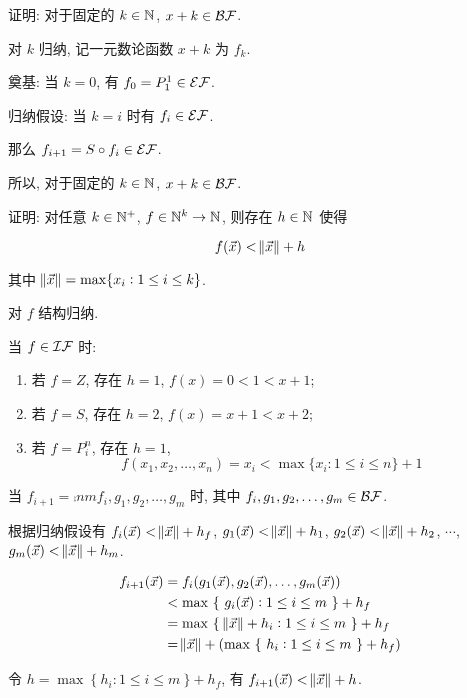 \begin{problem}
证明: 对于固定的 $k \in \mathbb{N}^{}$, $x + k \in \mathcal{BF}$.
\end{problem}

\begin{solution}
对 $k$ 归纳, 记一元数论函数 $x+k$ 为 $f_k$.

奠基: 当 $k = 0$, 有 $f_0 = P^1_1 \in \mathcal{EF}$.

归纳假设: 当 $k = i$ 时有 $f_i \in \mathcal{EF}$. 

那么 $f_{i + 1} = S \circ f_i \in \mathcal{EF}$.
\end{solution}

所以, 对于固定的 $k \in \mathbb{N}^{}$, $x + k \in \mathcal{BF}$.

\begin{problem}
证明: 对任意 $k \in \mathbb{N}^{+}$, $f \in \mathbb{N}^{k} \to \mathbb{N}^{}$, 则存在 $h \in \mathbb{N}^{}$ 使得

\[f(\vec{x}) < \norm{\vec{x}} + h\]

其中 $\norm{\vec{x}} = \max \{ x_i : 1 \le i \le k \}$.
\end{problem}

\begin{solution}
对 $f$ 结构归纳.

当 $f \in \mathcal{IF}$ 时:

\begin{enumerate}
    \item 若 $f = Z$, 存在 $h = 1$, $f(x) = 0 < 1 < x + 1$;
    \item 若 $f = S$, 存在 $h = 2$, $f(x) = x + 1 < x + 2$;
    \item 若 $f = P_i^n$, 存在 $h = 1$, $$f(x_1, x_2, \dots, x_n) = x_i < \max \{ x_i : 1 \le i \le n \} + 1$$
\end{enumerate}

当 $f_{i + 1} = \comp{n}{m}{f_i, g_1, g_2, \dots, g_m}$ 时, 其中 $f_i, g_1, g_2, \dots, g_m \in \mathcal{BF}$.

根据归纳假设有 $f_{i}(\vec{x}) < \norm{\vec{x}} + h_f$, $g_1(\vec{x}) < \norm{\vec{x}} + h_1$, $g_2(\vec{x}) < \norm{\vec{x}} + h_2$, $\cdots$, $g_m(\vec{x}) < \norm{\vec{x}} + h_m$.

\begin{align}
    f_{i+1}(\vec{x}) & = f_{i}(g_1(\vec{x}), g_2(\vec{x}), \dots, g_m(\vec{x})) \notag \\
    & < \max ~ \{ ~ g_i(\vec{x}) : 1 \le i \le m ~ \} + h_f \notag \\
    & = \max ~ \{ ~ \norm{\vec{x}} + h_i : 1 \le i \le m ~ \} + h_f \notag \\
    & = \norm{\vec{x}} + (\max ~ \{ ~ h_i : 1 \le i \le m ~ \} + h_f) \notag
\end{align}

令 $h = \max ~ \{ ~ h_i : 1 \le i \le m ~ \} + h_f$, 有 $f_{i+1}(\vec{x}) < \norm{\vec{x}} + h$.
\end{solution}


